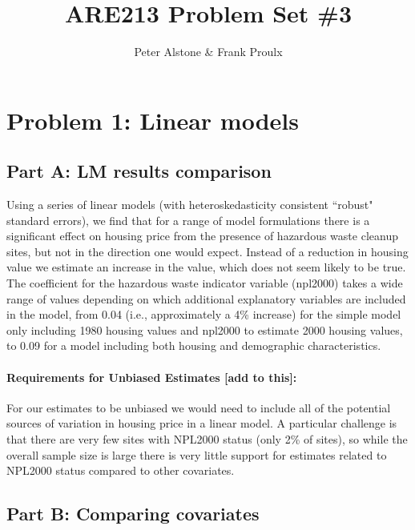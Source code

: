 \documentclass[letterpaper, 12pt]{article}
\begin{document}
\title{ARE213 Problem Set \#3}
\author{Peter Alstone \& Frank Proulx}
\maketitle

\section{Problem 1: Linear models}

\subsection{Part A: LM results comparison}



Using a series of linear models (with heteroskedasticity consistent ``robust" standard errors), we find that for a range of model formulations there is a significant effect on housing price from the presence of hazardous waste cleanup sites, but not in the direction one would expect.  Instead of a reduction in housing value we estimate an increase in the value, which does not seem likely to be true.  The coefficient for the hazardous waste indicator variable (npl2000) takes a wide range of values depending on which additional explanatory variables are included in the model, from 0.04 (i.e., approximately a 4\% increase) for the simple model only including 1980 housing values and npl2000 to estimate 2000 housing values, to 0.09 for a model including both housing and demographic characteristics.  

\paragraph{Requirements for Unbiased Estimates [add to this]:}For our estimates to be unbiased we would need to include all of the potential sources of variation in housing price in a linear model.  A particular challenge is that there are very few sites with NPL2000 status (only 2\% of sites), so while the overall sample size is large there is very little support for estimates related to NPL2000 status compared to other covariates.  

\subsection{Part B: Comparing covariates}


\end{document}
